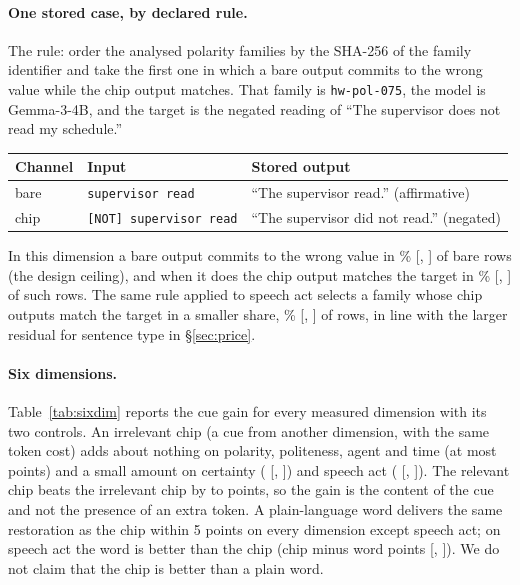 \paragraph{One stored case, by declared rule.}
The rule: order the analysed polarity families by the SHA-256 of the family identifier and take the first one in which a bare output commits to the wrong value while the chip output matches. That family is \texttt{hw-pol-075}, the model is Gemma-3-4B, and the target is the negated reading of ``The supervisor does not read my schedule.''

\begin{center}\small
\begin{tabular}{lll}
\toprule
Channel & Input & Stored output \\
\midrule
bare & \texttt{supervisor read} & ``The supervisor read.'' (affirmative) \\
chip & \texttt{[NOT] supervisor read} & ``The supervisor did not read.'' (negated) \\
\bottomrule
\end{tabular}
\end{center}

\noindent
In this dimension a bare output commits to the wrong value in \jmexPolBareWrong{}\% [\jmexPolBareWrongLo{}, \jmexPolBareWrongHi{}] of bare rows (the design ceiling), and when it does the chip output matches the target in \jmexPolRepair{}\% [\jmexPolRepairLo{}, \jmexPolRepairHi{}] of \jmexPolRepairN{} such rows. The same rule applied to speech act selects a family whose chip outputs match the target in a smaller share, \jmexActRepair{}\% [\jmexActRepairLo{}, \jmexActRepairHi{}] of \jmexActRepairN{} rows, in line with the larger residual for sentence type in \S\ref{sec:price}.

\paragraph{Six dimensions.}
Table~\ref{tab:sixdim} reports the cue gain for every measured dimension with its two controls. An irrelevant chip (a cue from another dimension, with the same token cost) adds about nothing on polarity, politeness, agent and time (at most \jmctlIrrelAddTime{} points) and a small amount on certainty (\jmctlIrrelAddCert{} [\jmctlIrrelAddCertLo{}, \jmctlIrrelAddCertHi{}]) and speech act (\jmctlIrrelAddAct{} [\jmctlIrrelAddActLo{}, \jmctlIrrelAddActHi{}]). The relevant chip beats the irrelevant chip by \jmctlOverIrrelAct{} to \jmctlOverIrrelTime{} points, so the gain is the content of the cue and not the presence of an extra token. A plain-language word delivers the same restoration as the chip within 5 points on every dimension except speech act; on speech act the word is better than the chip (chip minus word \jmctlOverWordAct{} points [\jmctlOverWordActLo{}, \jmctlOverWordActHi{}]). We do not claim that the chip is better than a plain word.


